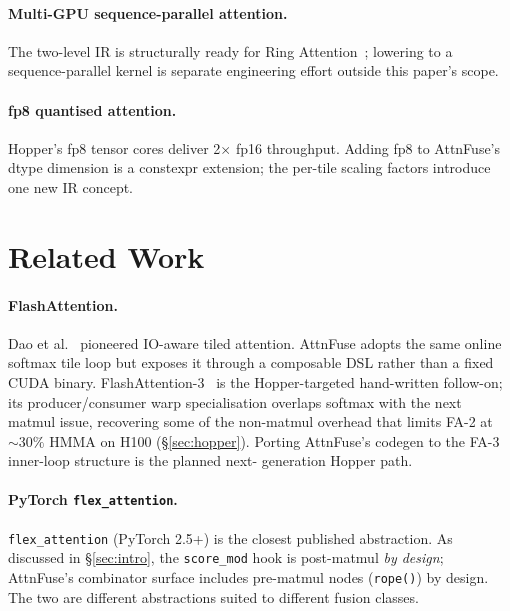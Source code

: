 \documentclass[10pt,twocolumn]{article}
\begin{document}
\paragraph{Multi-GPU sequence-parallel attention.} The two-level IR
is structurally ready for Ring Attention~\cite{liu2023ring}; lowering
to a sequence-parallel kernel is separate engineering effort outside
this paper's scope.

\paragraph{fp8 quantised attention.} Hopper's fp8 tensor cores
deliver 2$\times$ fp16 throughput. Adding fp8 to AttnFuse's dtype
dimension is a constexpr extension; the per-tile scaling factors
introduce one new IR concept.

\section{Related Work}
\label{sec:related}

\paragraph{FlashAttention.}
Dao et al.~\cite{dao2022flashattention,dao2023flashattention2}
pioneered IO-aware tiled attention. AttnFuse adopts the same online
softmax tile loop but exposes it through a composable DSL rather
than a fixed CUDA binary. FlashAttention-3~\cite{shah2024flashattention3}
is the Hopper-targeted hand-written follow-on; its producer/consumer
warp specialisation overlaps softmax with the next matmul issue,
recovering some of the non-matmul overhead that limits FA-2 at
$\sim 30\%$ HMMA on H100 (\S\ref{sec:hopper}). Porting AttnFuse's
codegen to the FA-3 inner-loop structure is the planned next-
generation Hopper path.

\paragraph{PyTorch \texttt{flex\_attention}.}
\texttt{flex\_attention} (PyTorch 2.5+) is the closest published
abstraction. As discussed in \S\ref{sec:intro}, the
\texttt{score\_mod} hook is post-matmul \emph{by design};
AttnFuse's combinator surface includes pre-matmul nodes
(\texttt{rope()}) by design. The two are different abstractions
suited to different fusion classes.
\end{document}
